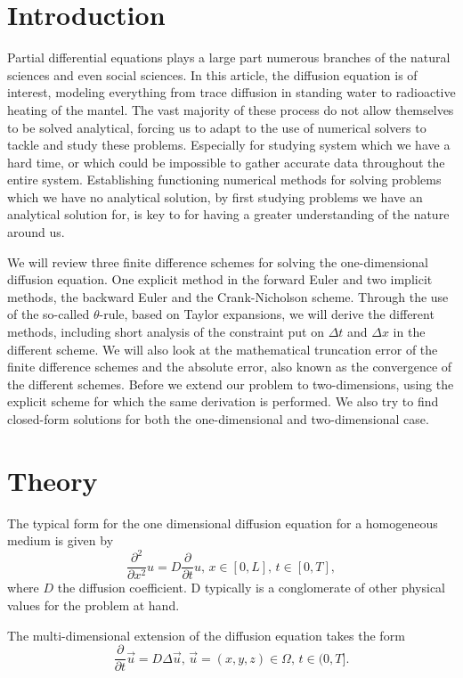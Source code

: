 \documentclass[%
reprint,
nofootinbib,
amsmath,amssymb,
aps,
]{revtex4-1}
\newcommand{\dt}{{\Delta t}}
\newcommand{\dx}{{\Delta x}}
\begin{document}
\section{Introduction} %
Partial differential equations plays a large part numerous branches of the natural sciences and even social sciences. In this article, the diffusion equation is of interest, modeling everything from trace diffusion in standing water to radioactive heating of the mantel. The vast majority of these process do not allow themselves to be solved analytical, forcing us to adapt to the use of numerical solvers to tackle and study these problems. Especially for studying system which we have a hard time, or which could be impossible to gather accurate data throughout the entire system. Establishing functioning numerical methods for solving problems which we have no analytical solution, by first studying problems we have an analytical solution for, is key to for having a greater understanding of the nature around us.

We will review three finite difference schemes for solving the one-dimensional diffusion equation. One explicit method in the forward Euler and two implicit methods, the backward Euler and the Crank-Nicholson scheme. Through the use of the so-called $\theta$-rule, based on Taylor expansions, we will derive the different methods, including short analysis of the constraint put on $\dt$ and $\dx$ in the different scheme. We will also look at the mathematical truncation error of the finite difference schemes and the absolute error, also known as the convergence of the different schemes. Before we extend our problem to two-dimensions, using the explicit scheme for which the same derivation is performed. We also try to find closed-form solutions for both the one-dimensional and two-dimensional case. 

\section{Theory} %
The typical form for the one dimensional diffusion equation for a homogeneous medium is given by 
\begin{equation}\label{eq:Standard diffusion equation}
	\frac{\partial^2 }{\partial x^2}u = D\frac{\partial}{\partial t}u,\, x\in[0,L],\, t\in[0,T],
\end{equation}
where $D$ the diffusion coefficient. D typically is a conglomerate of other physical values for the problem at hand.

The multi-dimensional extension of the diffusion equation takes the form 
\begin{equation}\label{eq Multi dim diffusion equation}
	\frac{\partial}{\partial t}\vec{u} = D\Delta \vec{u}, \, \vec{u} = (x,y,z)\in\Omega,\, t\in(0,T].
\end{equation}
\end{document}
